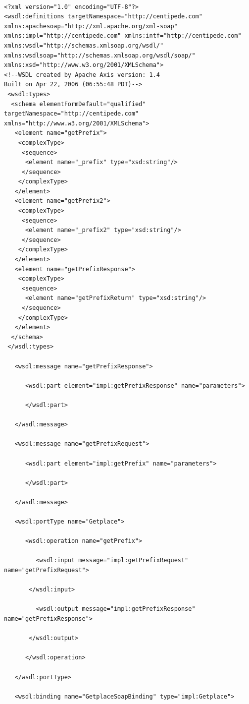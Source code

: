 \documentclass[conference]{IEEEtran}
\begin{document}
\begin{verbatim}

<?xml version="1.0" encoding="UTF-8"?>
<wsdl:definitions targetNamespace="http://centipede.com" xmlns:apachesoap="http://xml.apache.org/xml-soap" xmlns:impl="http://centipede.com" xmlns:intf="http://centipede.com" xmlns:wsdl="http://schemas.xmlsoap.org/wsdl/" xmlns:wsdlsoap="http://schemas.xmlsoap.org/wsdl/soap/" xmlns:xsd="http://www.w3.org/2001/XMLSchema">
<!--WSDL created by Apache Axis version: 1.4
Built on Apr 22, 2006 (06:55:48 PDT)-->
 <wsdl:types>
  <schema elementFormDefault="qualified" targetNamespace="http://centipede.com" xmlns="http://www.w3.org/2001/XMLSchema">
   <element name="getPrefix">
    <complexType>
     <sequence>
      <element name="_prefix" type="xsd:string"/>
     </sequence>
    </complexType>
   </element>
   <element name="getPrefix2">
    <complexType>
     <sequence>
      <element name="_prefix2" type="xsd:string"/>
     </sequence>
    </complexType>
   </element>
   <element name="getPrefixResponse">
    <complexType>
     <sequence>
      <element name="getPrefixReturn" type="xsd:string"/>
     </sequence>
    </complexType>
   </element>
  </schema>
 </wsdl:types>

   <wsdl:message name="getPrefixResponse">

      <wsdl:part element="impl:getPrefixResponse" name="parameters">

      </wsdl:part>

   </wsdl:message>

   <wsdl:message name="getPrefixRequest">

      <wsdl:part element="impl:getPrefix" name="parameters">

      </wsdl:part>

   </wsdl:message>

   <wsdl:portType name="Getplace">

      <wsdl:operation name="getPrefix">

         <wsdl:input message="impl:getPrefixRequest" name="getPrefixRequest">

       </wsdl:input>

         <wsdl:output message="impl:getPrefixResponse" name="getPrefixResponse">

       </wsdl:output>

      </wsdl:operation>

   </wsdl:portType>

   <wsdl:binding name="GetplaceSoapBinding" type="impl:Getplace">


\end{verbatim}
\end{document}

